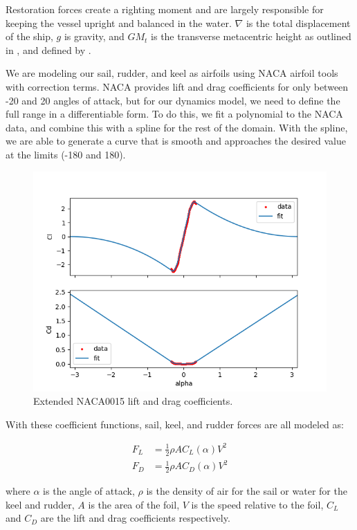 \documentclass[conference]{IEEEtran}
\begin{document}
Restoration forces create a righting moment and are largely responsible for keeping the vessel upright and balanced in the water. $\nabla$ is the total displacement of the ship, $g$ is gravity, and $GM_t$ is the transverse metacentric height as outlined in \cite{ModelingCourseControl}, and defined by \cite{fossen2011handbook}.

We are modeling our sail, rudder, and keel as airfoils using NACA airfoil tools \cite{NACA} with correction terms.  NACA provides lift and drag coefficients for only between -20\degree{} and 20\degree{} angles of attack, but for our dynamics model, we need to define the full range in a differentiable form. To do this, we fit a polynomial to the NACA data, and combine this with a spline for the rest of the domain. With the spline, we are able to generate a curve that is smooth and approaches the desired value at the limits (-180\degree{} and 180\degree{}).

\begin{figure}[ht]
    \centering
    \includegraphics[width=.9\columnwidth]{fig/naca0015.png}
    \caption{Extended NACA0015 lift and drag coefficients.}
    \label{fig:naca0015}
\end{figure}

With these coefficient functions, sail, keel, and rudder forces are all modeled as:

\begin{align}
    F_L &= \frac{1}{2} \rho A C_L(\alpha)V^2 \\
    F_D &= \frac{1}{2} \rho A C_D(\alpha)V^2
\end{align}

where $\alpha$ is the angle of attack, $\rho$ is the density of air for the sail or water for the keel and rudder, $A$ is the area of the foil, $V$ is the speed relative to the foil, $C_L$ and $C_D$ are the lift and drag coefficients respectively.
\end{document}
